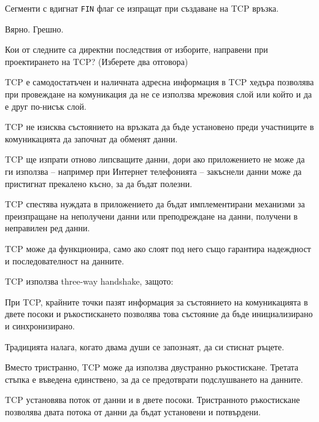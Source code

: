 \begin{questions}
  \question[6] Сегменти с вдигнат \texttt{FIN} флаг се изпращат при създаване на
  TCP връзка.
  \begin{oneparchoices}
    \choice Вярно.
    \CorrectChoice Грешно.
  \end{oneparchoices}

  \question[6] Кои от следните са директни последствия от изборите, направени
  при проектирането на TCP? (Изберете два отговора)
  \begin{choices}
    \choice TCP е самодостатъчен и наличната адресна информация в TCP хедъра
    позволява при провеждане на комуникация да не се използва мрежовия слой или
    който и да е друг по-нисък слой.

    \choice TCP не изисква състоянието на връзката да бъде установено преди
    участниците в комуникацията да започнат да обменят данни.

    \CorrectChoice TCP ще изпрати отново липсващите данни, дори ако приложението
    не може да ги използва -- например при Интернет телефонията -- закъснели
    данни може да пристигнат прекалено късно, за да бъдат полезни.

    \CorrectChoice TCP спестява нуждата в приложението да бъдат имплементирани
    механизми за преизпращане на неполучени данни или преподреждане на данни,
    получени в неправилен ред данни.

    \choice TCP може да функционира, само ако слоят под него също гарантира
    надеждност и последователност на данните.
  \end{choices}

  \question[6] TCP използва three-way handshake, защото:
  \begin{choices}

    \CorrectChoice При TCP, крайните точки пазят информация за състоянието на
    комуникацията в двете посоки и ръкостискането позволява това състояние да
    бъде инициализирано и синхронизирано.

    \choice Традицията налага, когато двама души се запознаят, да си стиснат
    ръцете.

    \choice Вместо тристранно, TCP може да използва двустранно
    ръкостискане. Третата стъпка е въведена единствено, за да се предотврати
    подслушването на данните.

    \CorrectChoice TCP установява поток от данни и в двете посоки. Тристранното
    ръкостискане позволява двата потока от данни да бъдат установени и потвърдени.
  \end{choices}


\end{questions}
